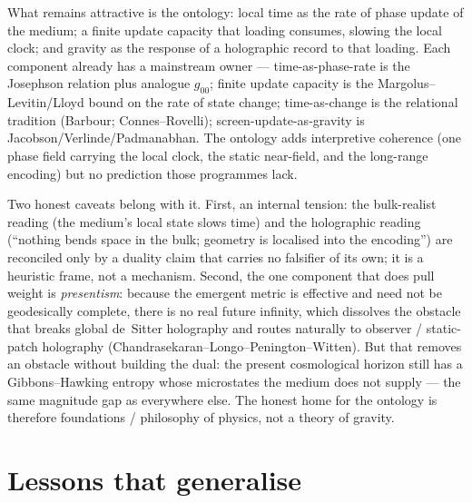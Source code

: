 \documentclass[11pt]{article}
\begin{document}
What remains attractive is the ontology: local time as the rate of phase update of
the medium; a finite update capacity that loading consumes, slowing the local
clock; and gravity as the response of a holographic record to that loading. Each
component already has a mainstream owner --- time-as-phase-rate is the Josephson
relation plus analogue $g_{00}$; finite update capacity is the
Margolus--Levitin/Lloyd bound on the rate of state change; time-as-change is the
relational tradition (Barbour; Connes--Rovelli); screen-update-as-gravity is
Jacobson/Verlinde/Padmanabhan. The ontology adds interpretive coherence (one
phase field carrying the local clock, the static near-field, and the long-range
encoding) but no prediction those programmes lack.

Two honest caveats belong with it. First, an internal tension: the bulk-realist
reading (the medium's local state slows time) and the holographic reading
(``nothing bends space in the bulk; geometry is localised into the encoding'')
are reconciled only by a duality claim that carries no falsifier of its own; it
is a heuristic frame, not a mechanism. Second, the one component that does pull
weight is \emph{presentism}: because the emergent metric is effective and need not
be geodesically complete, there is no real future infinity, which dissolves the
obstacle that breaks global de~Sitter holography and routes naturally to
observer / static-patch holography (Chandrasekaran--Longo--Penington--Witten). But
that removes an obstacle without building the dual: the present cosmological
horizon still has a Gibbons--Hawking entropy whose microstates the medium does not
supply --- the same magnitude gap as everywhere else. The honest home for the
ontology is therefore foundations / philosophy of physics, not a theory of
gravity.

\section{Lessons that generalise}
\end{document}
